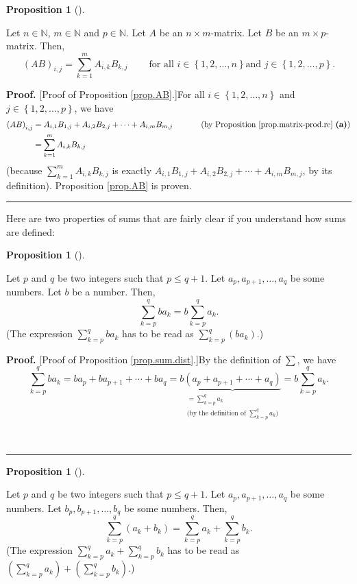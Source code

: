 \documentclass[numbers=enddot,12pt,final,onecolumn,notitlepage]{scrartcl}%
\theoremstyle{definition}
\newtheorem{prop}[theo]{Proposition}
\newenvironment{proposition}[1][]
{\begin{prop}[#1]\begin{leftbar}}
{\end{leftbar}\end{prop}}
\newenvironment{proof}[1][Proof]{\noindent\textbf{#1.} }{\ \rule{0.5em}{0.5em}}
\let\sumnonlimits\sum
\renewcommand{\sum}{\sumnonlimits\limits}
\begin{document}
\begin{proposition}
\label{prop.AB}Let $n\in\mathbb{N}$, $m\in\mathbb{N}$ and $p\in\mathbb{N}$.
Let $A$ be an $n\times m$-matrix. Let $B$ be an $m\times p$-matrix. Then,%
\[
\left(  AB\right)  _{i,j}=\sum_{k=1}^{m}A_{i,k}B_{k,j}%
\ \ \ \ \ \ \ \ \ \ \text{for all }i\in\left\{  1,2,\ldots,n\right\}  \text{
and }j\in\left\{  1,2,\ldots,p\right\}  .
\]

\end{proposition}

\begin{proof}
[Proof of Proposition \ref{prop.AB}.]For all $i\in\left\{  1,2,\ldots
,n\right\}  $ and $j\in\left\{  1,2,\ldots,p\right\}  $, we have%
\begin{align*}
\left(  AB\right)  _{i,j}  &  =A_{i,1}B_{1,j}+A_{i,2}B_{2,j}+\cdots
+A_{i,m}B_{m,j}\ \ \ \ \ \ \ \ \ \ \left(  \text{by Proposition
\ref{prop.matrix-prod.rc} \textbf{(a)}}\right) \\
&  =\sum_{k=1}^{m}A_{i,k}B_{k,j}%
\end{align*}
(because $\sum_{k=1}^{m}A_{i,k}B_{k,j}$ is exactly $A_{i,1}B_{1,j}%
+A_{i,2}B_{2,j}+\cdots+A_{i,m}B_{m,j}$, by its definition). Proposition
\ref{prop.AB} is proven.
\end{proof}

Here are two properties of sums that are fairly clear if you understand how
sums are defined:

\begin{proposition}
\label{prop.sum.dist}Let $p$ and $q$ be two integers such that $p\leq q+1$.
Let $a_{p},a_{p+1},\ldots,a_{q}$ be some numbers. Let $b$ be a number. Then,
\[
\sum_{k=p}^{q}ba_{k}=b\sum_{k=p}^{q}a_{k}.
\]
(The expression $\sum_{k=p}^{q}ba_{k}$ has to be read as $\sum_{k=p}%
^{q}\left(  ba_{k}\right)  $.)
\end{proposition}

\begin{proof}
[Proof of Proposition \ref{prop.sum.dist}.]By the definition of $\sum$, we
have%
\[
\sum_{k=p}^{q}ba_{k}=ba_{p}+ba_{p+1}+\cdots+ba_{q}=b\underbrace{\left(
a_{p}+a_{p+1}+\cdots+a_{q}\right)  }_{\substack{=\sum_{k=p}^{q}a_{k}%
\\\text{(by the definition of }\sum_{k=p}^{q}a_{k}\text{)}}}=b\sum_{k=p}%
^{q}a_{k}.
\]

\end{proof}

\begin{proposition}
\label{prop.sum.a+b}Let $p$ and $q$ be two integers such that $p\leq q+1$. Let
$a_{p},a_{p+1},\ldots,a_{q}$ be some numbers. Let $b_{p},b_{p+1},\ldots,b_{q}$
be some numbers. Then,
\[
\sum_{k=p}^{q}\left(  a_{k}+b_{k}\right)  =\sum_{k=p}^{q}a_{k}+\sum_{k=p}%
^{q}b_{k}.
\]
(The expression $\sum_{k=p}^{q}a_{k}+\sum_{k=p}^{q}b_{k}$ has to be read as
$\left(  \sum_{k=p}^{q}a_{k}\right)  +\left(  \sum_{k=p}^{q}b_{k}\right)  $.)
\end{proposition}
\end{document}
